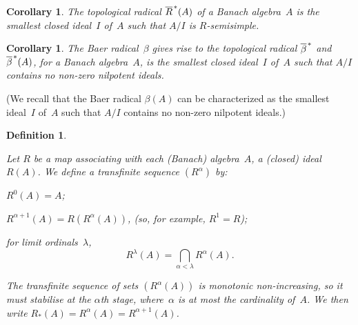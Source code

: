 \documentclass[11pt]{article}
\newcounter{rmenum}
\newenvironment{rmenumerate}{\begin{list}{(\roman{rmenum})}%
{\usecounter{rmenum}}}{\end{list}}
\newcommand{\closure}[1]{\overline{#1}}
\newcommand{\al}{\alpha}
\newcommand{\lm}{\lambda}
\newtheorem{cor}[thm]{Corollary}
\newtheorem{definition}[thm]{Definition}
\newenvironment{Defn}{\begin{definition}\begin{rm}}{\end{rm}\end{definition}}
\newcommand{\Detail}[1]{}
\newcommand{\Rsubstar}{R_*}
\newcommand{\barstar}[1]{{\closure{#1}\kern 1pt}^*}
\begin{document}
\begin{cor}\label{C3a}
The topological radical $\barstar{R}(A)$ of a Banach algebra~$A$ is the
smallest {\em closed} ideal~$I$ of~$A$ such that $A/I$ is $R$-semisimple.
\end{cor}

\begin{cor}\label{C4}
The Baer radical~$\beta$ gives rise to the topological radical $\barstar{\beta}$
and $\barstar{\beta}(A)$, for a Banach algebra~$A$, is the smallest closed
ideal~$I$ of~$A$ such that $A/I$ contains no non-zero nilpotent ideals.
\end{cor}

(We recall that the Baer radical $\beta(A)$ can be characterized as the smallest
ideal~$I$ of~$A$ such that $A/I$ contains no non-zero nilpotent ideals.)

\Detail{In one direction, $\barstar{\beta}(A)$ is a closed ideal such that
$\closure{\beta}(A/\barstar{\beta}(A)) = \{0\}$; {\it id est}
$A/\barstar{\beta}(A)$ contains no non-zero nilpotent ideals.   Conversely,
let $I$ be a closed ideal such that $A/I$ contains no non-zero nilpotent ideals.
Then $I \supseteq \beta(A)$, since $\beta(A)$ is the smallest ideal the quotient
by which contains no non-zero nilpotent ideals.  Since~$I$ is closed,
$I \supseteq \closure{\beta}(A)$.    Now
$$(A/\closure{\beta(A)})/(I/\closure{\beta(A)}) \equiv A/I$$
contains no non-zero nilpotent ideals, so
$$I/\closure{\beta(A)} \supseteq \beta\left(A/\closure{\beta(A)}\right)$$
so, since $I/\closure{\beta(A)}$ is closed,
$$I/\closure{\beta(A)} \supseteq \closure{\beta}\left(A/\closure{\beta(A)}\right)
                               = \closure{\beta}_2(A)/\closure{\beta(A)}),$$
so $I \supseteq \closure{\beta}_2(A)$.   The proof that
$I \supseteq \closure{\beta}_\alpha(A)$ for all ordinals~$\alpha$ proceeds by
induction in the same way, the limit ordinal step being trivial.   Therefore
$I \supseteq \barstar{\beta}(A)$.     The proof of the previous corollary is
similar.}

\begin{Defn}
Let $R$ be a map associating with each (Banach) algebra~$A$, a (closed)
ideal $R(A)$.   We define a transfinite sequence $(R^\al)$ by:
\begin{rmenumerate}
\item $R^0(A) = A$;
\item $R^{\al+1}(A) = R(R^\al(A))$,    (so, for example, $R^1 = R$);
\item for limit ordinals~$\lm$, $$R^\lm(A) = \bigcap_{\al < \lm}R^\al(A).$$
\end{rmenumerate}
The transfinite sequence of sets $(R^\al(A))$ is monotonic non-increasing, so it
must stabilise at the $\al$th stage, where~$\al$ is at most the cardinality
of~$A$.  We then write $\Rsubstar(A) = R^\al(A) = R^{\al+1}(A)$.
\end{Defn}
\end{document}
